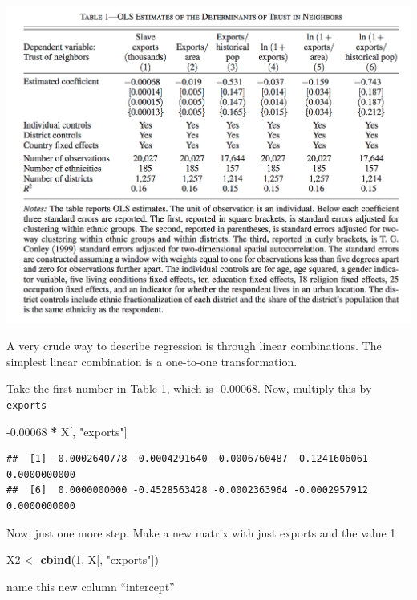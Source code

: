 \documentclass[]{book}
\newenvironment{Shaded}{\begin{snugshade}}{\end{snugshade}}
\newcommand{\DecValTok}[1]{\textcolor[rgb]{0.00,0.00,0.81}{#1}}
\newcommand{\FloatTok}[1]{\textcolor[rgb]{0.00,0.00,0.81}{#1}}
\newcommand{\KeywordTok}[1]{\textcolor[rgb]{0.13,0.29,0.53}{\textbf{#1}}}
\newcommand{\NormalTok}[1]{#1}
\newcommand{\OperatorTok}[1]{\textcolor[rgb]{0.81,0.36,0.00}{\textbf{#1}}}
\newcommand{\StringTok}[1]{\textcolor[rgb]{0.31,0.60,0.02}{#1}}
\theoremstyle{definition}
\theoremstyle{definition}
\theoremstyle{definition}
\theoremstyle{remark}
\begin{document}
\includegraphics{images/nunn_wantchekon_table1.png}

A very crude way to describe regression is through linear combinations. The simplest linear combination is a one-to-one transformation.

Take the first number in Table 1, which is -0.00068. Now, multiply this by \texttt{exports}

\begin{Shaded}
\begin{Highlighting}[]
\FloatTok{-0.00068} \OperatorTok{*}\StringTok{ }\NormalTok{X[, }\StringTok{"exports"}\NormalTok{]}
\end{Highlighting}
\end{Shaded}

\begin{verbatim}
##  [1] -0.0002640778 -0.0004291640 -0.0006760487 -0.1241606061  0.0000000000
##  [6]  0.0000000000 -0.4528563428 -0.0002363964 -0.0002957912  0.0000000000
\end{verbatim}

Now, just one more step. Make a new matrix with just exports and the value 1

\begin{Shaded}
\begin{Highlighting}[]
\NormalTok{X2 <-}\StringTok{ }\KeywordTok{cbind}\NormalTok{(}\DecValTok{1}\NormalTok{, X[, }\StringTok{"exports"}\NormalTok{])}
\end{Highlighting}
\end{Shaded}

name this new column ``intercept''
\end{document}
